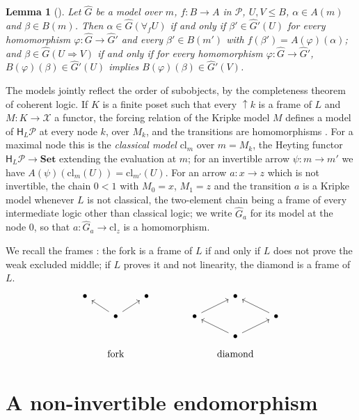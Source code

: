 \documentclass[11pt]{amsart}
\newtheorem{lem}[thm]{Lemma}
\theoremstyle{definition}
\newcommand{\Set}{\mathbf{Set}}
\newcommand{\HH}{\mathsf H}
\newcommand{\cX}{\mathcal X}
\newcommand{\cP}{\mathcal P}
\begin{document}
\begin{lem}[{\cite[Lemma~2.2]{Strings}}]\label{lem:truth}
Let $\hat G$ be a model over $m$, $f\colon B\to A$ in $\cP$, $U,V\le
B$, $\alpha\in A(m)$ and $\beta\in B(m)$. Then $\alpha\in\hat G(\forall_f
U)$ if and only if $\beta'\in\hat G'(U)$ for every homomorphism
$\varphi\colon\hat G\to\hat G'$ and every $\beta'\in B(m')$ with
$f(\beta')=A(\varphi)(\alpha)$; and $\beta\in\hat G(U\Rightarrow V)$ if
and only if for every homomorphism $\varphi\colon\hat G\to\hat G'$,
$B(\varphi)(\beta)\in\hat G'(U)$ implies $B(\varphi)(\beta)\in\hat
G'(V)$.
\end{lem}

The models jointly reflect the order of subobjects, by the
completeness theorem of coherent logic. If $K$ is a finite poset such
that every $\uparrow\!k$ is a frame of $L$ and $M\colon K\to\cX$ a
functor, the forcing relation of the Kripke model $M$ defines a model
of $\HH_L\cP$ at every node $k$, over $M_k$, and the transitions are
homomorphisms \cite[Lemma~2.3]{Interm}. For a maximal node this is the
\emph{classical model} $\mathrm{cl}_m$ over $m=M_k$, the Heyting
functor $\HH_L\cP\to\Set$ extending the evaluation at $m$; for an
invertible arrow $\psi\colon m\to m'$ we have $A(\psi)(\mathrm{cl}_m(U))
=\mathrm{cl}_{m'}(U)$. For an arrow $a\colon x\to z$ which is not
invertible, the chain $0<1$ with $M_0=x$, $M_1=z$ and the transition
$a$ is a Kripke model whenever $L$ is not classical, the two-element
chain being a frame of every intermediate logic other than classical
logic; we write $\hat G_a$ for its model at the node $0$, so that
$a\colon\hat G_a\to\mathrm{cl}_z$ is a homomorphism.

We recall the frames \cite[Lemma~3.1]{Interm}: the fork is a frame of
$L$ if and only if $L$ does not prove the weak excluded middle; if $L$
proves it and not linearity, the diamond is a frame of $L$.
\[
\begin{tikzcd}[column sep=small,row sep=small]
\bullet&&\bullet&&&&\bullet&\\
&\bullet\ar[ul]\ar[ur]&&&&\bullet\ar[ur]&&\bullet\ar[ul]\\
&&&&&&\bullet\ar[ul]\ar[ur]&\\[-1ex]
&\text{fork}&&&&&\text{diamond}&
\end{tikzcd}
\]

\section{A non-invertible endomorphism}
\end{document}
